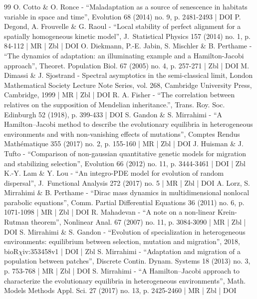 \begin{thebibliography}{99}
O. Cotto \& O. Ronce - “Maladaptation as a source of senescence in habitats variable in space and time”, Evolution 68 (2014) no. 9, p. 2481-2493 | DOI
P. Degond, A. Frouvelle \& G. Raoul - “Local stability of perfect alignment for a spatially homogeneous kinetic model”, J. Statistical Physics 157 (2014) no. 1, p. 84-112 | MR | Zbl | DOI
O. Diekmann, P.-E. Jabin, S. Mischler \& B. Perthame - “The dynamics of adaptation: an illuminating example and a Hamilton-Jacobi approach”, Theoret. Population Biol. 67 (2005) no. 4, p. 257-271 | Zbl | DOI
M. Dimassi \& J. Sjostrand - Spectral asymptotics in the semi-classical limit, London Mathematical Society Lecture Note Series, vol. 268, Cambridge University Press, Cambridge, 1999 | MR | Zbl | DOI
R. A. Fisher - “The correlation between relatives on the supposition of Mendelian inheritance.”, Trans. Roy. Soc. Edinburgh 52 (1918), p. 399-433 | DOI
S. Gandon \& S. Mirrahimi - “A Hamilton–Jacobi method to describe the evolutionary equilibria in heterogeneous environments and with non-vanishing effects of mutations”, Comptes Rendus Mathématique 355 (2017) no. 2, p. 155-160 | MR | Zbl | DOI
J. Huisman \& J. Tufto - “Comparison of non-gaussian quantitative genetic models for migration and stabilizing selection”, Evolution 66 (2012) no. 11, p. 3444-3461 | DOI | Zbl
K.-Y. Lam \& Y. Lou - “An integro-PDE model for evolution of random dispersal”, J. Functional Analysis 272 (2017) no. 5 | MR | Zbl | DOI
A. Lorz, S. Mirrahimi \& B. Perthame - “Dirac mass dynamics in multidimensional nonlocal parabolic equations”, Comm. Partial Differential Equations 36 (2011) no. 6, p. 1071-1098 | MR | Zbl | DOI
R. Mahadevan - “A note on a non-linear Krein-Rutman theorem”, Nonlinear Anal. 67 (2007) no. 11, p. 3084-3090 | MR | Zbl | DOI
S. Mirrahimi \& S. Gandon - “Evolution of specialization in heterogeneous environments: equilibrium between selection, mutation and migration”, 2018, bioR$\chi$iv:353458v1 | DOI | Zbl
S. Mirrahimi - “Adaptation and migration of a population between patches”, Discrete Contin. Dynam. Systems 18 (2013) no. 3, p. 753-768 | MR | Zbl | DOI
S. Mirrahimi - “A Hamilton–Jacobi approach to characterize the evolutionary equilibria in heterogeneous environments”, Math. Models Methods Appl. Sci. 27 (2017) no. 13, p. 2425-2460 | MR | Zbl | DOI

\end{thebibliography}

